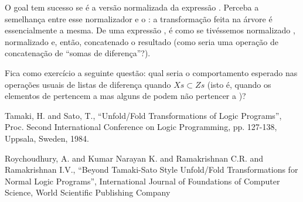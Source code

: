 \noindent O goal  tem sucesso se
 é a versão normalizada da expressão .  Perceba a
semelhança entre esse normalizador e o : a
transformação feita na árvore é essencialmente a mesma. De uma
expressão , é como se tivéssemos normalizado ,
normalizado  e, então, concatenado o resultado (como seria uma
operação de concatenação de ``somas de diferença''?).

Fica como exercício a seguinte questão: qual seria o comportamento
esperado nas operações usuais de listas de diferença
 quando $Xs \subset Zs$ (isto é, quando os
elementos de  pertencem a  mas alguns de 
podem não pertencer a )?

  \begin{thebibliography}{1}

     Tamaki, H. and Sato, T., ``Unfold/Fold
      Transformations of Logic Programs'', Proc. Second International
      Conference on Logic Programming, pp. 127-138, Uppsala, Sweden,
      1984.

     Roychoudhury, A. and Kumar Narayan K. and
      Ramakrishnan C.R. and Ramakrishnan I.V., ``Beyond Tamaki-Sato
      Style Unfold/Fold Transformations for Normal Logic Programs'',
      International Journal of Foundations of Computer Science, World
      Scientific Publishing Company

  \end{thebibliography}

%
